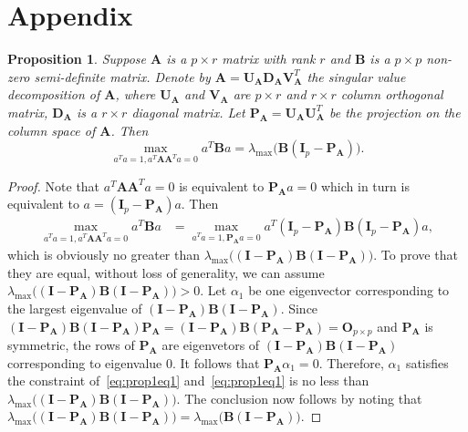 \documentclass[12pt]{article} %
\newcommand{\bA}{\mathbf{A}}
\newcommand{\bB}{\mathbf{B}}
\newcommand{\bP}{\mathbf{P}}
\newcommand{\bO}{\mathbf{O}}
\newcommand{\bI}{\mathbf{I}}
\newcommand{\bU}{\mathbf{U}}
\newcommand{\bD}{\mathbf{D}}
\newcommand{\bV}{\mathbf{V}}
\newtheorem{proposition}{Proposition}
\theoremstyle{definition}
\begin{document}





\section*{Appendix}

\begin{proposition}\label{optProp}
    Suppose $\bA$ is a $p\times r$ matrix with rank $r$ and $\bB$ is a $p\times p$  non-zero semi-definite matrix.
    Denote by $\bA=\bU_\bA \bD_\bA \bV_\bA^T$ the singular value decomposition of $\bA$, where $\bU_\bA$ and $\bV_\bA$ are $p\times r$ and $r\times r$ column orthogonal matrix, $\bD_\bA$ is a $r\times r$ diagonal matrix.
    Let $\bP_\bA=\bU_\bA \bU_\bA^T$ be the projection on the column space of $\bA$.
    Then
    \begin{equation}
        \max_{a^T a=1, a^T \bA \bA^T a=0}a^T \bB a=
        \lambda_{\max}\big(\bB(\bI_p-\bP_\bA)\big).
    \end{equation}
\end{proposition}
\begin{proof}
    Note that $a^T \bA \bA^T a=0$ is equivalent to $\bP_\bA a=0$ which in turn is equivalent to $a= (\bI_p-\bP_\bA)a$.
    Then
    \begin{equation}\label{eq:prop1eq1}
        \begin{aligned}
        \max_{a^T a=1, a^T \bA \bA^T a=0}a^T \bB a
            &=
        \max_{a^T a=1, \bP_\bA a=0}a^T(\bI_p-\bP_\bA) \bB (\bI_p-\bP_\bA)a,
        \end{aligned}
    \end{equation}
    which is obviously no greater than $\lambda_{\max}\big((\bI-\bP_\bA)\bB(\bI-\bP_\bA)\big)$.
    To prove that they are equal,  without loss of generality, we can assume $\lambda_{\max}\big((\bI-\bP_\bA)\bB(\bI-\bP_\bA)\big)>0$.
    Let $\alpha_1$ be one eigenvector corresponding to the largest eigenvalue of $(\bI-\bP_\bA)\bB(\bI-\bP_\bA)$.
    Since $(\bI-\bP_\bA)\bB(\bI-\bP_\bA)\bP_\bA=(\bI-\bP_\bA)\bB(\bP_\bA-\bP_\bA)=\bO_{p\times p}$ and $\bP_\bA$ is symmetric, the rows of $\bP_\bA$ are eigenvetors of $(\bI-\bP_\bA)\bB(\bI-\bP_\bA)$ corresponding to eigenvalue $0$.
    It follows that $\bP_\bA\alpha_1=0$.
    Therefore, $\alpha_1$ satisfies the constraint of~\eqref{eq:prop1eq1} and~\eqref{eq:prop1eq1} is no less than $\lambda_{\max}\big((\bI-\bP_\bA)\bB(\bI-\bP_\bA)\big)$.
    The conclusion now follows by noting that $\lambda_{\max}\big((\bI-\bP_\bA)\bB(\bI-\bP_\bA)\big)=\lambda_{\max}\big( \bB(\bI-\bP_\bA)\big)$.
    
\end{proof}
\end{document}
